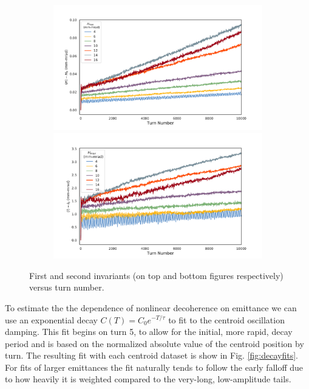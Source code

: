 \documentclass[aps,prstab,twocolumn, groupedaddress]{revtex4-1}
\begin{document}
\begin{figure}[htb]
	\centering
	\begin{subfigure}[b]{\columnwidth}
		\centering
		\includegraphics[width=\columnwidth]{first_inv_mean.pdf}%
		\hfill
		\includegraphics[width=\columnwidth]{second_inv_mean.pdf}
	\end{subfigure}
	\caption{First and second invariants (on top and bottom figures respectively) versus 
	turn number.}
	\label{fig:10kinvariants}
\end{figure}

To estimate the the dependence of nonlinear decoherence on emittance we can use an 
exponential decay $C(T) = C_0 e^{-T/\tau}$ to fit to the centroid oscillation damping. This 
fit begins on turn 5, to allow for the initial, more rapid, decay period and is based on the 
normalized absolute value of the centroid position by turn. The resulting fit with each 
centroid dataset is show in Fig. \ref{fig:decayfits}. For fits of larger emittances the fit 
naturally tends to follow the early falloff due to how heavily it is weighted compared to the 
very-long, low-amplitude tails.
\end{document}
